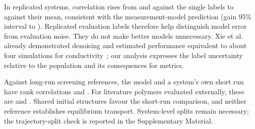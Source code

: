 \documentclass[preprint,12pt]{elsarticle}
\begin{document}
In replicated systems, correlation rises from \mlRepA{} and \mlRepB{} against the single labels
to \mlRepMean{} against their mean, consistent with the measurement-model prediction
\mlRepMeanExp{} (gain 95\% interval \mlRepGainLo{} to \mlRepGainHi). Replicated evaluation labels
therefore help distinguish model error from evaluation noise. They do not make better models
unnecessary. Xie et al. already demonstrated denoising and estimated performance equivalent to
about four simulations for conductivity~\cite{Xie2022Accelerating}; our analysis expresses the
label uncertainty relative to the population and its consequences for metrics.

Against long-run screening references, the model and a system's own short run have rank
correlations \mlLongScreenModel{} and \mlLongScreenShort{}. For literature polymers evaluated
externally, these are \mlLongLitModel{} and \mlLongLitShort{}. Shared initial structures favour
the short-run comparison, and neither reference establishes equilibrium transport.
System-level splits remain necessary; the trajectory-split check is reported in the Supplementary
Material.

\begin{table}[ht]
\centering
\caption{Noise ceiling of short-run labels in the screening population: reliability of the mean of
$n$ runs, model-implied population correlation ceiling, and Gaussian-model recall of the highest expected short-run labels. Origin-averaged labels use lag $T/2$.}\label{tab:ceiling}
{\footnotesize}
\end{table}

\begin{table}[ht]
\centering
\caption{Out-of-sample correlation of one random forest on monomer fingerprints with end-point
short-run labels, for cross-validation split by system or by chemical family of the monomer
(first three rows), and for the same predictions evaluated on the \nRep{} replicated systems
against each of their two labels or their mean (last two rows). The ceiling is the population
correlation implied by the reliability of the evaluation label; its interval rests on the
run-to-run noise of the \nRep{} replicated systems, not on the \mlNSys{} systems.}\label{tab:ml}
{\small\setlength{\tabcolsep}{3pt}}
\end{table}
\end{document}
